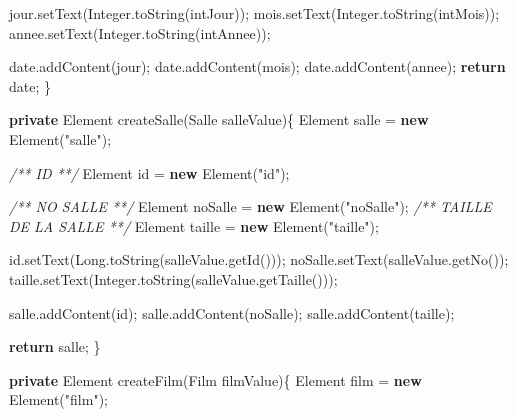 \documentclass[]{article}
\newenvironment{Shaded}{}{}
\newcommand{\KeywordTok}[1]{\textcolor[rgb]{0.00,0.44,0.13}{\textbf{{#1}}}}
\newcommand{\StringTok}[1]{\textcolor[rgb]{0.25,0.44,0.63}{{#1}}}
\newcommand{\CommentTok}[1]{\textcolor[rgb]{0.38,0.63,0.69}{\textit{{#1}}}}
\newcommand{\FunctionTok}[1]{\textcolor[rgb]{0.02,0.16,0.49}{{#1}}}
\newcommand{\BuiltInTok}[1]{{#1}}
\newcommand{\NormalTok}[1]{{#1}}
\begin{document}
\begin{Shaded}
\begin{Highlighting}[]
		\NormalTok{jour.}\FunctionTok{setText}\NormalTok{(}\BuiltInTok{Integer}\NormalTok{.}\FunctionTok{toString}\NormalTok{(intJour));}
		\NormalTok{mois.}\FunctionTok{setText}\NormalTok{(}\BuiltInTok{Integer}\NormalTok{.}\FunctionTok{toString}\NormalTok{(intMois));}
		\NormalTok{annee.}\FunctionTok{setText}\NormalTok{(}\BuiltInTok{Integer}\NormalTok{.}\FunctionTok{toString}\NormalTok{(intAnnee));}

		\NormalTok{date.}\FunctionTok{addContent}\NormalTok{(jour);}
		\NormalTok{date.}\FunctionTok{addContent}\NormalTok{(mois);}
		\NormalTok{date.}\FunctionTok{addContent}\NormalTok{(annee);}
		\KeywordTok{return} \NormalTok{date;}
	\NormalTok{\}}

	\KeywordTok{private} \BuiltInTok{Element} \FunctionTok{createSalle}\NormalTok{(Salle salleValue)\{}
		\BuiltInTok{Element} \NormalTok{salle = }\KeywordTok{new} \BuiltInTok{Element}\NormalTok{(}\StringTok{"salle"}\NormalTok{);}

		\CommentTok{/** ID **/}
		\BuiltInTok{Element} \NormalTok{id = }\KeywordTok{new} \BuiltInTok{Element}\NormalTok{(}\StringTok{"id"}\NormalTok{);}

		\CommentTok{/** NO SALLE **/}
		\BuiltInTok{Element} \NormalTok{noSalle = }\KeywordTok{new} \BuiltInTok{Element}\NormalTok{(}\StringTok{"noSalle"}\NormalTok{);}
		\CommentTok{/** TAILLE DE LA SALLE **/}
		\BuiltInTok{Element} \NormalTok{taille = }\KeywordTok{new} \BuiltInTok{Element}\NormalTok{(}\StringTok{"taille"}\NormalTok{);}

		\NormalTok{id.}\FunctionTok{setText}\NormalTok{(}\BuiltInTok{Long}\NormalTok{.}\FunctionTok{toString}\NormalTok{(salleValue.}\FunctionTok{getId}\NormalTok{()));}
		\NormalTok{noSalle.}\FunctionTok{setText}\NormalTok{(salleValue.}\FunctionTok{getNo}\NormalTok{());}
		\NormalTok{taille.}\FunctionTok{setText}\NormalTok{(}\BuiltInTok{Integer}\NormalTok{.}\FunctionTok{toString}\NormalTok{(salleValue.}\FunctionTok{getTaille}\NormalTok{()));}

		\NormalTok{salle.}\FunctionTok{addContent}\NormalTok{(id);}
		\NormalTok{salle.}\FunctionTok{addContent}\NormalTok{(noSalle);}
		\NormalTok{salle.}\FunctionTok{addContent}\NormalTok{(taille);}

		\KeywordTok{return} \NormalTok{salle;}
	\NormalTok{\}}

	\KeywordTok{private} \BuiltInTok{Element} \FunctionTok{createFilm}\NormalTok{(Film filmValue)\{}
		\BuiltInTok{Element} \NormalTok{film = }\KeywordTok{new} \BuiltInTok{Element}\NormalTok{(}\StringTok{"film"}\NormalTok{);}


\end{Highlighting}
\end{Shaded}
\end{document}
